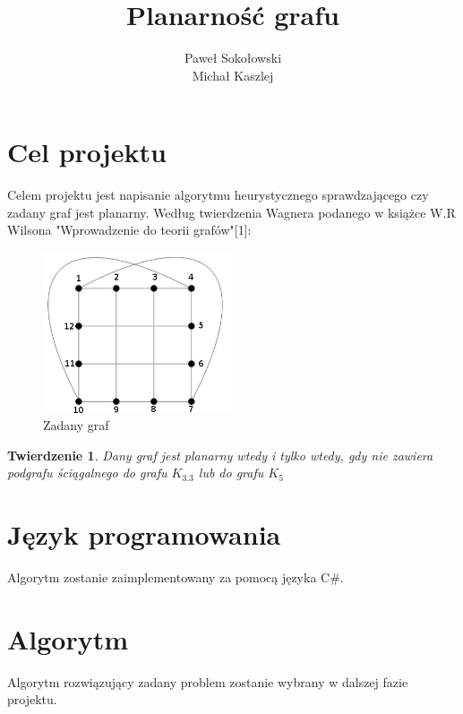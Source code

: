 \documentclass[a4 122pt]{article}
\title{Planarność grafu}
\author{Paweł Sokołowski\\Michał Kaszlej}
\newtheorem{twierdzenie}{Twierdzenie}
\begin{document}
\maketitle

	\section{Cel projektu}

		Celem projektu jest napisanie algorytmu heurystycznego sprawdzającego czy zadany graf jest planarny.
		Według twierdzenia Wagnera podanego w książce W.R Wilsona "Wprowadzenie do teorii grafów"[1]:

		\begin{figure}[h]
			\begin{center}
				\includegraphics[width=0.5\textwidth]{include/graf.png}
				\caption{Zadany graf}
			\end{center}
		\end{figure}

		\begin{twierdzenie}
		Dany graf jest planarny wtedy i tylko wtedy, gdy nie zawiera podgrafu ściągalnego do grafu $K_{3.3}$ lub do grafu $ K_5 $
		\end{twierdzenie}

	\section{Język programowania} 

		Algorytm zostanie zaimplementowany za pomocą języka C\#.

	\section{Algorytm}

		Algorytm rozwiązujący zadany problem zostanie wybrany w dalszej fazie projektu.

	\pagebreak
\end{document}
